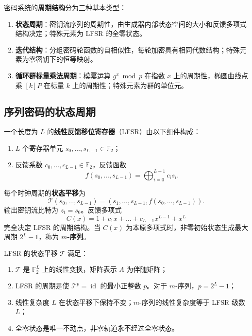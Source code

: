 \begin{definition}[密码系统的周期结构]\label{def:crypto_periodic_structure}
密码系统的\textbf{周期结构}分为三种基本类型：
\begin{enumerate}[label=(\roman*)]
    \item \textbf{状态周期}：密钥流序列的周期性，由生成器内部状态空间的大小和反馈多项式结构决定；特殊元素为 LFSR 的全零状态。
    \item \textbf{迭代结构}：分组密码轮函数的自相似性，每轮加密具有相同代数结构；特殊元素为零密钥下的恒等映射。
    \item \textbf{循环群标量乘法周期}：模幂运算 \(g^x\bmod p\) 在指数 \(x\) 上的周期性，椭圆曲线点乘 \([k]P\) 在标量 \(k\) 上的周期性；特殊元素为群的单位元。
\end{enumerate}
\end{definition}

\subsection{序列密码的状态周期}

\begin{definition}[线性反馈移位寄存器]\label{def:lfsr}
一个长度为 \(L\) 的\textbf{线性反馈移位寄存器}（LFSR）由以下组件构成：
\begin{enumerate}[label=(\roman*)]
    \item \(L\) 个寄存器单元 \(s_0,\dots,s_{L-1}\in\mathbb F_2\)；
    \item 反馈系数 \(c_0,\dots,c_{L-1}\in\mathbb F_2\)，反馈函数
    \[
    f(s_0,\dots,s_{L-1})=\bigoplus_{i=0}^{L-1}c_i s_i.
    \]
\end{enumerate}
每个时钟周期的\textbf{状态平移}为
\[
\mathcal T(s_0,\dots,s_{L-1})=(s_1,\dots,s_{L-1},f(s_0,\dots,s_{L-1})).
\]
输出密钥流比特为 \(z_t=s_0\)。反馈多项式
\[
C(x)=1+c_1x+\dots+c_{L-1}x^{L-1}+x^L
\]
完全决定 LFSR 的周期结构。当 \(C(x)\) 为本原多项式时，非零初始状态生成最大周期 \(2^L-1\)，称为 \textbf{\(m\)-序列}。
\end{definition}

\begin{proposition}\label{prop:lfsr_algebraic_properties}
LFSR 的状态平移 \(\mathcal T\) 满足：
\begin{enumerate}[label=(\roman*)]
    \item \(\mathcal T\) 是 \(\mathbb F_2^L\) 上的线性变换，矩阵表示 \(A\) 为伴随矩阵；
    \item LFSR 的周期是使 \(\mathcal T^p=\operatorname{id}\) 的最小正整数 \(p\)。对于 \(m\)-序列，\(p=2^L-1\)；
    \item 线性复杂度 \(L\) 在状态平移下保持不变；\(m\)-序列的线性复杂度等于 LFSR 级数 \(L\)；
    \item 全零状态是唯一不动点，非零轨道永不经过全零状态。
\end{enumerate}
\end{proposition}

